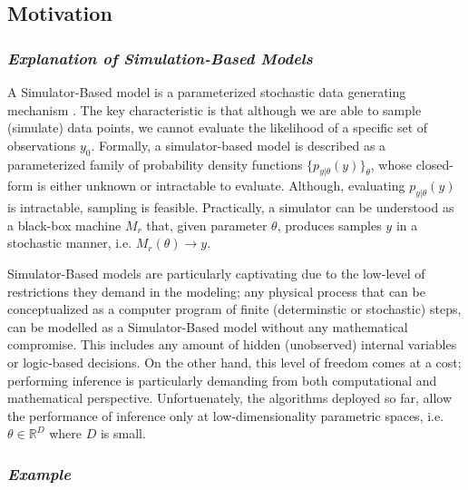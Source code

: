 \subsection{Motivation}
\label{subsec:motivation}

\subsubsection*{\textit{Explanation of Simulation-Based Models}}

A Simulator-Based model is a parameterized stochastic data generating mechanism \cite{Gutmann2016}. The key characteristic is that although we are able to sample (simulate) data points, we cannot evaluate the likelihood of a specific set of observations $y_0$. Formally, a simulator-based model is described as a parameterized family of probability density functions $\{p_{y|\theta}(y)\}_\theta$, whose closed-form is either unknown or intractable to evaluate. Although, evaluating $p_{y|\theta}(y)$ is intractable, sampling is feasible. Practically, a simulator can be understood as a black-box machine $M_r$ that, given parameter $\theta$, produces samples $y$ in a stochastic manner, i.e. $M_r(\theta) \rightarrow y$.

Simulator-Based models are particularly captivating due to the low-level of restrictions they demand in the modeling; any physical process that can be conceptualized as a computer program of finite (determinstic or stochastic) steps, can be modelled as a Simulator-Based model without any mathematical compromise. This includes any amount of hidden (unobserved) internal variables or logic-based decisions. On the other hand, this level of freedom comes at a cost; performing inference is particularly demanding from both computational and mathematical perspective. Unfortuenately, the algorithms deployed so far, allow the performance of inference only at low-dimensionality parametric spaces, i.e. $\theta \in \mathbb{R}^D$  where $D$ is small.

\subsubsection*{\textit{Example}}

